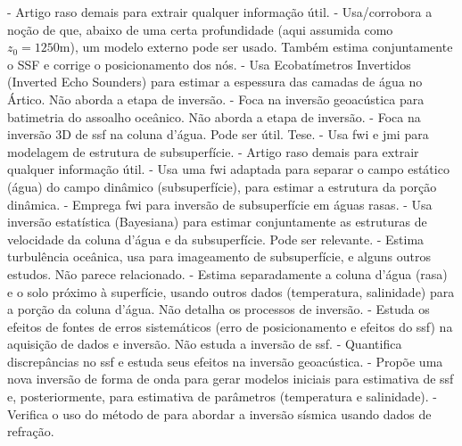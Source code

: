 \begin{itemize}
	 - Artigo raso demais para extrair qualquer informação útil.
	 - Usa/corrobora a noção de que, abaixo de uma certa profundidade (aqui assumida como $z_0 = 1250\si{\meter}$), um modelo externo pode ser usado. Também estima conjuntamente o SSF e corrige o posicionamento dos nós.
	 - Usa Ecobatímetros Invertidos (Inverted Echo Sounders) para estimar a espessura das camadas de água no Ártico. Não aborda a etapa de inversão.
	 - Foca na inversão geoacústica para batimetria do assoalho oceânico. Não aborda a etapa de inversão.
	 - Foca na inversão 3D de \gls{ssf} na coluna d'água. Pode ser útil. Tese.
	 - Usa \gls{fwi} e \gls{jmi} para modelagem de estrutura de subsuperfície.
	 - Artigo raso demais para extrair qualquer informação útil.
	 - Usa uma \gls{fwi} adaptada para separar o campo estático (água) do campo dinâmico (subsuperfície), para estimar a estrutura da porção dinâmica.
	 - Emprega \gls{fwi} para inversão de subsuperfície em águas rasas.
	 - Usa inversão estatística (Bayesiana) para estimar conjuntamente as estruturas de velocidade da coluna d'água e da subsuperfície. Pode ser relevante.
	 - Estima turbulência oceânica, usa  para imageamento de subsuperfície, e alguns outros estudos. Não parece relacionado.
	 - Estima separadamente a coluna d'água (rasa) e o solo próximo à superfície, usando outros dados (temperatura, salinidade) para a porção da coluna d'água. Não detalha os processos de inversão.
	 - Estuda os efeitos de fontes de erros sistemáticos (erro de posicionamento e efeitos do \gls{ssf}) na aquisição de dados e inversão. Não estuda a inversão de \gls{ssf}.
	 - Quantifica discrepâncias no \gls{ssf} e estuda seus efeitos na inversão geoacústica.
	 - Propõe uma nova inversão de forma de onda para gerar modelos iniciais para estimativa de \gls{ssf} e, posteriormente, para estimativa de parâmetros (temperatura e salinidade).
	 - Verifica o uso do método de  para abordar a inversão sísmica usando dados de refração.

\end{itemize}
